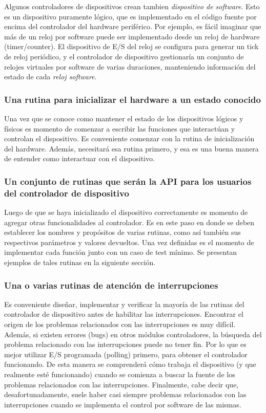 \documentclass[output=paper, 
colorlinks,
citecolor=brown,
newtxmath
]{langscibook}
\begin{document}
Algunos controladores de dispositivos crean tambien \textit{dispositivo de software}.
Esto es un dispositivo puramente lógico, que es implementado en el 
código fuente por encima del controlador del hardware periférico. Por 
ejemplo, es fácil imaginar que más de un reloj por software puede ser 
implementado desde un reloj de hardware (timer/counter). El dispositivo 
de E/S del reloj se configura
para generar un tick de reloj periódico, y el controlador de dispositivo
gestionaría un conjunto de relojes virtuales por software de varias duraciones,
manteniendo información del estado de cada \textit{reloj software}.

\subsubsection*{Una rutina para inicializar el hardware a un estado conocido}

Una vez que se conoce como mantener el estado de los dispositivos 
lógicos y físicos es momento de comenzar a escribir las funciones que 
interactúan y controlan el dispositivo. Es conveniente comenzar 
con la rutina de inicialización del hardware. Además, necesitará
esa rutina primero, y esa es una buena manera de entender como interactuar
con el dispositivo.

\subsubsection*{Un conjunto de rutinas que serán la API para los
usuarios del controlador de dispositivo}

Luego de que se haya inicializado el dispositivo correctamente es
momento de agregar otras funcionalidades al controlador. Es en este
paso en donde se deben establecer los nombres y propósitos de varias 
rutinas, como así también sus respectivos parámetros y valores devueltos.
Una vez definidas es el momento de implementar cada función junto
con un caso de test mínimo. Se presentan ejemplos de tales rutinas
en la siguiente sección.

\subsubsection*{Una o varias rutinas de atención de interrupciones}

Es conveniente diseñar, implementar y verificar la mayoría de las rutinas
del controlador de dispositivo antes de habilitar las interrupciones.
Encontrar el origen de los problemas relacionados con las interrupciones
es muy difícil. Además, si existen errores (bugs) en otros módulos
controladores, la búsqueda del problema relacionado con las interrupciones
puede no tener fin. Por lo que es mejor utilizar 
E/S programada (polling) primero, para obtener el controlador funcionando.
De esta manera se comprenderá cómo trabaja el dispositivo (y que 
realmente esté funcionando) cuando se comienza a buscar la fuente
de los problemas relacionados con las interrupciones. Finalmente, cabe
decir que, desafortunadamente, suele haber casi siempre problemas 
relacionados con las interrupciones cuando se implementa el control por 
software de las mismas.
\end{document}
